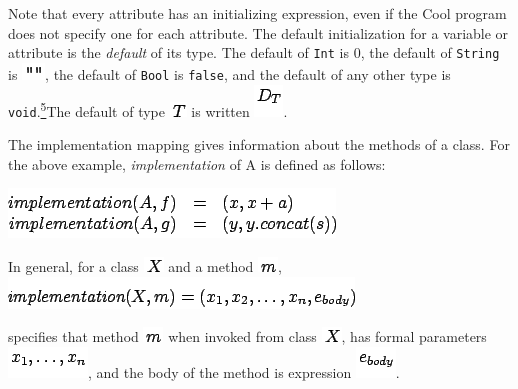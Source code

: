 \documentclass[]{article}
\begin{document}
Note that every attribute has an initializing expression, even if the
Cool program does not specify one for each attribute. The default
initialization for a variable or attribute is the \emph{default} of its
type. The default of \texttt{Int} is 0, the default of \texttt{String}
is \includegraphics{img148.png}, the default of \texttt{Bool} is
\texttt{false}, and the default of any other type is
\texttt{void}.\href{footnode.html\#foot1803}{\textsuperscript{5}}The
default of type \includegraphics{img58.png} is written
\includegraphics{img149.png}.

The implementation mapping gives information about the methods of a
class. For the above example, \emph{implementation} of A is defined as
follows:

\includegraphics{img150.png}

In general, for a class \includegraphics{img141.png} and a method
\includegraphics{img151.png}, \\

\includegraphics{img152.png}

specifies that method \includegraphics{img151.png} when invoked from
class \includegraphics{img141.png}, has formal parameters
\includegraphics{img153.png}, and the body of the method is expression
\includegraphics{img154.png}.
\end{document}
